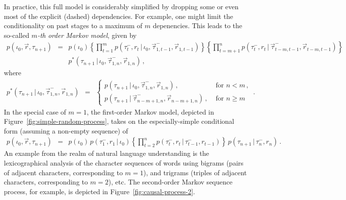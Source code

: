 \documentclass[a4paper]{article}
\newcommand{\vr}{\vec{r}}
\newcommand{\tm}{\tau^{-}}
\begin{document}
In practice, this full model is considerably simplified by dropping some or even most of the explicit (dashed) dependencies.
For example, one might limit the 
conditionality on past stages to a maximum of $m$ depenencies.
This leads to the so-called {\em $m$-th order Markov model},
given by
\begin{eqnarray}
p(\iota_0,\vr,\tau_{n+1}) & = &
p(\iota_0)
\left\{\prod_{t=1}^{m}p(\tm_t,r_t\,|\,\iota_0,\vec{\tau}^-_{1,t-1},\vr_{1,t-1})\right\}
\left\{\prod_{t=m+1}^{n}p(\tm_t,r_t\,|\,\vec{\tau}^-_{t-m,t-1},\vr_{t-m,t-1})\right\}
\nonumber\\&&
 p^*(\tau_{n+1}\,|\,\iota_0,\vec{\tau}^-_{1,n},\vr_{1,n})
\,,
\label{eq:m-th-order}
\end{eqnarray}
where
\begin{eqnarray}
 p^*(\tau_{n+1}\,|\,\iota_0,\vec{\tau}^-_{1,n},\vr_{1,n}) & = & \left\{\begin{array}{ll}
 p(\tau_{n+1}\,|\,\iota_0,\vec{\tau}^-_{1,n},\vr_{1,n})\,, &
\mbox{ for $n<m$}\,,
\\
 p(\tau_{n+1}\,|\,\vec{\tau}^-_{n-m+1,n},\vr_{n-m+1,n})\,, &
\mbox{ for $n\ge m$}
\end{array}\right.\,.
\end{eqnarray}
In the special case of $m=1$, the first-order Markov model,
depicted in Figure~\ref{fig:simple-random-process}, takes on the especially-simple conditional form
(assuming a non-empty sequence) of
\begin{eqnarray}
p(\iota_0,\vr,\tau_{n+1}) & = &
p(\iota_0)\,p(\tm_1,r_1\,|\,\iota_0)
\left\{\prod_{t=2}^{n}p(\tm_t,r_t\,|\,\tm_{t-1},r_{t-1})\right\}
\,p(\tau_{n+1}\,|\,\tm_n,r_n)
\,.
\end{eqnarray}
An example from the realm of natural language understanding is the lexicographical analysis of the character
sequences of words using bigrams (pairs of adjacent characters, corresponding to $m=1$), and trigrams 
(triples of adjacent characters, corresponding to $m=2$), etc.
The second-order Markov sequence process, for example, is depicted in Figure~\ref{fig:causal-process-2}.
\end{document}
